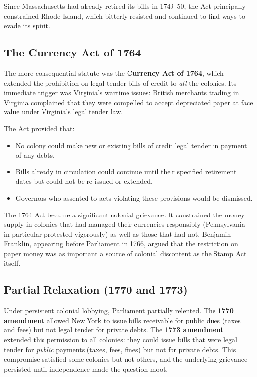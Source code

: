 \documentclass[12pt]{article}
\begin{document}
Since Massachusetts had already retired its bills in 1749--50, the Act
principally constrained Rhode Island, which bitterly resisted and continued to
find ways to evade its spirit.

\subsection{The Currency Act of 1764}

The more consequential statute was the \textbf{Currency Act of 1764}, which
extended the prohibition on legal tender bills of credit to \emph{all} the
colonies.  Its immediate trigger was Virginia's wartime issues: British
merchants trading in Virginia complained that they were compelled to accept
depreciated paper at face value under Virginia's legal tender law.

The Act provided that:

\begin{itemize}[nosep]
    \item No colony could make new or existing bills of credit legal tender in
          payment of any debts.
    \item Bills already in circulation could continue until their specified
          retirement dates but could not be re-issued or extended.
    \item Governors who assented to acts violating these provisions would be
          dismissed.
\end{itemize}

The 1764 Act became a significant colonial grievance.  It constrained the money
supply in colonies that had managed their currencies responsibly
(Pennsylvania in particular protested vigorously) as well as those that had
not.  Benjamin Franklin, appearing before Parliament in 1766, argued that the
restriction on paper money was as important a source of colonial discontent as
the Stamp Act itself.

\subsection{Partial Relaxation (1770 and 1773)}

Under persistent colonial lobbying, Parliament partially relented.  The
\textbf{1770 amendment} allowed New York to issue bills receivable for public
dues (taxes and fees) but not legal tender for private debts.  The \textbf{1773
amendment} extended this permission to all colonies: they could issue bills
that were legal tender for \emph{public} payments (taxes, fees, fines) but not
for private debts.  This compromise satisfied some colonies but not others, and
the underlying grievance persisted until independence made the question moot.
\end{document}
